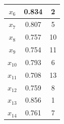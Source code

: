 \documentclass[UTF8]{ctexart}
\begin{document}
\begin{minipage}{\textwidth}
\begin{minipage}[t]{0.48\textwidth}
\begin{tabular}{|c|c|c|}
            $x_{6}$  & 0.834  & 2    \\ \hline
            $x_{7}$  & 0.807  & 5    \\ \hline
            $x_{8}$  & 0.757  & 10   \\ \hline
            $x_{9}$  & 0.754  & 11   \\ \hline
            $x_{10}$ & 0.793  & 6    \\ \hline
            $x_{11}$ & 0.708  & 13   \\ \hline
            $x_{12}$ & 0.759  & 8    \\ \hline
            $x_{13}$ & 0.856  & 1    \\ \hline
            $x_{14}$ & 0.761  & 7    \\ \hline
        \end{tabular}
    \end{minipage}
\end{minipage}
~\\
\end{document}
